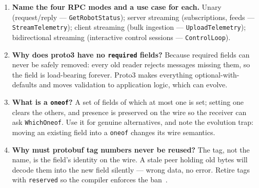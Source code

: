 \begin{enumerate}[label=\textbf{Q\arabic*.}, leftmargin=1.5cm]
        \texttt{grpc-status}, and END\_STREAM --- headers and trailers
        collapsed into one frame. Most gRPC error responses look like this on
        the wire.
  \item \textbf{Name the four RPC modes and a use case for each.}
        Unary (request/reply --- \texttt{GetRobotStatus}); server streaming
        (subscriptions, feeds --- \texttt{StreamTelemetry}); client streaming
        (bulk ingestion --- \texttt{UploadTelemetry}); bidirectional streaming
        (interactive control sessions --- \texttt{ControlLoop}).
  \item \textbf{Why does proto3 have no \texttt{required} fields?}
        Because required fields can never be safely removed: every old reader
        rejects messages missing them, so the field is load-bearing forever.
        Proto3 makes everything optional-with-defaults and moves validation to
        application logic, which can evolve.
  \item \textbf{What is a \texttt{oneof}?}
        A set of fields of which at most one is set; setting one clears the
        others, and presence is preserved on the wire so the receiver can ask
        \texttt{WhichOneof}. Use it for genuine alternatives, and note the
        evolution trap: moving an existing field into a \texttt{oneof} changes
        its wire semantics.
  \item \textbf{Why must protobuf tag numbers never be reused?}
        The tag, not the name, is the field's identity on the wire. A stale
        peer holding old bytes will decode them into the new field silently ---
        wrong data, no error. Retire tags with \texttt{reserved} so the
        compiler enforces the ban~\cite{protobufdocs}.


\end{enumerate}

